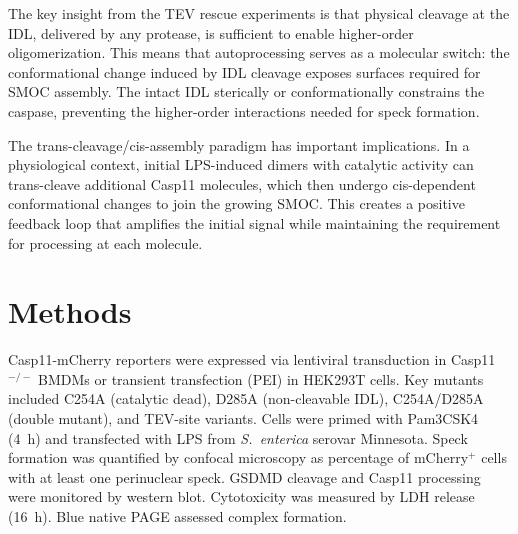 \documentclass[11pt]{article}
\begin{document}
The key insight from the TEV rescue experiments is that physical cleavage at the IDL, delivered by any protease, is sufficient to enable higher-order oligomerization. This means that autoprocessing serves as a molecular switch: the conformational change induced by IDL cleavage exposes surfaces required for SMOC assembly. The intact IDL sterically or conformationally constrains the caspase, preventing the higher-order interactions needed for speck formation.

The trans-cleavage/cis-assembly paradigm has important implications. In a physiological context, initial LPS-induced dimers with catalytic activity can trans-cleave additional Casp11 molecules, which then undergo cis-dependent conformational changes to join the growing SMOC. This creates a positive feedback loop that amplifies the initial signal while maintaining the requirement for processing at each molecule.

\section{Methods}

Casp11-mCherry reporters were expressed via lentiviral transduction in Casp11$^{-/-}$ BMDMs or transient transfection (PEI) in HEK293T cells. Key mutants included C254A (catalytic dead), D285A (non-cleavable IDL), C254A/D285A (double mutant), and TEV-site variants. Cells were primed with Pam3CSK4 (4~h) and transfected with LPS from \textit{S.\ enterica} serovar Minnesota. Speck formation was quantified by confocal microscopy as percentage of mCherry$^+$ cells with at least one perinuclear speck. GSDMD cleavage and Casp11 processing were monitored by western blot. Cytotoxicity was measured by LDH release (16~h). Blue native PAGE assessed complex formation.



\end{document}
